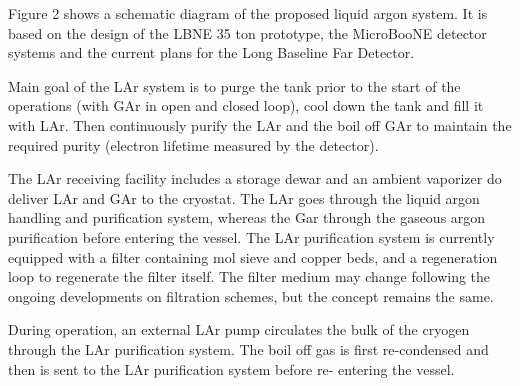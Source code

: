 Figure 2 shows a schematic diagram of the proposed liquid argon system. It is based on the design of the 
LBNE 35 ton prototype, the MicroBooNE detector systems and the current plans for the Long Baseline Far 
Detector.

Main goal of the LAr system is to purge the tank prior to the start of the operations (with GAr in open and 
closed loop), cool down the tank and fill it with LAr. Then continuously purify the LAr and the boil off GAr 
to maintain the required purity (electron lifetime measured by the detector).

The LAr receiving facility includes a storage dewar and an ambient vaporizer do deliver LAr and GAr to the 
cryostat. The LAr goes through the liquid argon handling and purification system, whereas the Gar through 
the gaseous argon purification before entering the vessel.
The LAr purification system is currently equipped with a filter containing mol sieve and copper beds, and a 
regeneration loop to regenerate the filter itself. The filter medium may change following the ongoing 
developments on filtration schemes, but the concept remains the same.

During operation, an external LAr pump circulates the bulk of the cryogen through the LAr purification 
system. The boil off gas is first re-condensed and then is sent to the LAr purification system before re-
entering the vessel.



